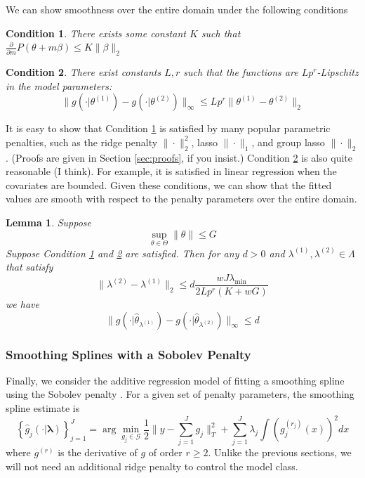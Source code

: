 \documentclass[12pt]{article}
\newtheorem{lemma}{Lemma}
\newtheorem{condition}{Condition}
\begin{document}
We can show smoothness over the entire domain under the following conditions
\begin{condition}
\label{condn:param1}
There exists some constant $K$ such that
$\frac{\partial}{\partial m}P(\theta + m \beta) \le K \|\beta\|_{2}$
\end{condition}
\begin{condition}
\label{condn:param2}
There exist constants $L, r$ such that the functions are $Lp^r$-Lipschitz in the model parameters:
\begin{equation}
\|g(\cdot|\theta^{(1)})-g(\cdot|\theta^{(2)})\|_{\infty}\le Lp^{r}\|\theta^{(1)}-\theta^{(2)}\|_{2}
\end{equation}
\end{condition}

It is easy to show that Condition \ref{condn:param1} is satisfied by many popular parametric penalties, such as the ridge penalty $\| \cdot \|_2^2$, lasso $\| \cdot \|_1$, and group lasso $\| \cdot \|_2$. (Proofs are given in Section \ref{sec:proofs}, if you insist.) Condition \ref{condn:param2} is also quite reasonable (I think). For example, it is satisfied in linear regression when the covariates are bounded. Given these conditions, we can show that the fitted values are smooth with respect to the penalty parameters over the entire domain.

\begin{lemma}
\label{lemma:parametric}
Suppose
\[
\sup_{\theta\in\Theta}\|\theta\|\le G
\]
Suppose Condition \ref{condn:param1} and \ref{condn:param2} are satisfied.
Then for any $d>0$ and $\lambda^{(1)}, \lambda^{(2)} \in \Lambda$ that satisfy
\[
\|\lambda^{(2)}-\lambda^{(1)}\|_{2}\le d\frac{wJ\lambda_{\min}}{2Lp^{r}\left(K+wG\right)}
\]
we have
\[
\|g(\cdot|\hat{\theta}_{\lambda^{(1)}})-g(\cdot|\hat{\theta}_{\lambda^{(2)}})\|_{\infty}\le d
\]
\end{lemma}

\subsubsection{Smoothing Splines with a Sobolev Penalty}

Finally, we consider the additive regression model of fitting a smoothing spline using the Sobolev penalty \citep{de1978practical, wahba1990spline, green1994nonparametric}. For a given set of penalty parameters, the smoothing spline estimate is
\begin{equation}
\left \{ \hat{g}_j(\cdot | \boldsymbol \lambda) \right \}_{j=1}^J =\arg\min_{g_j\in\mathcal{G}}\frac{1}{2}\|y- \sum_{j=1}^J g_j\|_{T}^{2}+ \sum_{j=1}^J \lambda_j \int (g_j^{(r_j)}(x))^2 dx
\end{equation}
where $g^{(r)}$ is the derivative of $g$ of order $r \ge 2$. Unlike the previous sections, we will not need an additional ridge penalty to control the model class.
\end{document}

